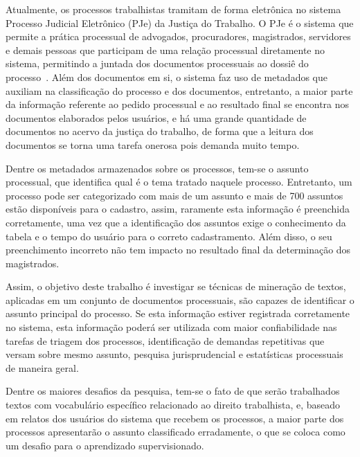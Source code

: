 Atualmente, os processos trabalhistas tramitam de forma eletrônica no sistema Processo Judicial Eletrônico  (PJe) da Justiça do Trabalho. O PJe é o sistema que permite a prática processual de advogados, procuradores,  magistrados, servidores e demais pessoas que participam de uma relação processual diretamente no sistema, permitindo a juntada dos documentos processuais ao dossiê do processo~\cite{pje}. Além dos documentos em si, o sistema faz uso de metadados que auxiliam na classificação do processo e dos documentos, entretanto, a maior parte da informação referente ao pedido processual e ao resultado final se encontra nos documentos elaborados pelos usuários, e há uma grande quantidade de documentos no acervo da justiça do trabalho, de forma que a leitura dos documentos se torna uma tarefa onerosa pois demanda muito tempo. 

Dentre os metadados armazenados sobre os processos, tem-se o assunto processual, que identifica qual é o tema tratado naquele processo. Entretanto, um processo pode ser categorizado com mais de um assunto e mais de 700 assuntos estão disponíveis para o cadastro, assim, raramente esta informação é preenchida corretamente, uma vez que a identificação dos assuntos exige o conhecimento da tabela e o tempo do usuário para o correto cadastramento. 
Além disso, o seu preenchimento incorreto não tem impacto no resultado final da determinação dos magistrados. 



Assim, o objetivo deste trabalho é investigar se técnicas de mineração de textos, aplicadas em um conjunto de documentos processuais, são capazes de identificar o assunto principal do processo. Se esta informação estiver registrada corretamente no sistema, esta informação poderá ser utilizada com maior confiabilidade nas tarefas de triagem dos processos, identificação de demandas repetitivas que versam sobre mesmo assunto, pesquisa jurisprudencial e estatísticas processuais de maneira geral. 

Dentre os maiores desafios da pesquisa, tem-se o fato de que serão trabalhados textos com vocabulário específico relacionado ao direito trabalhista, e, baseado em relatos dos usuários do sistema que recebem os processos, a maior parte dos processos apresentarão o assunto classificado erradamente, o que se coloca como um desafio para o aprendizado supervisionado. 

